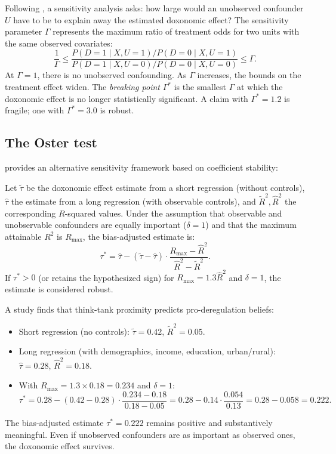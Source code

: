 \begin{model}
\label{mod:sensitivity}
Following \textcite{rosenbaum2002}, a sensitivity analysis asks: how large would an unobserved confounder $U$ have to be to explain away the estimated doxonomic effect?
The sensitivity parameter $\Gamma$ represents the maximum ratio of treatment odds for two units with the same observed covariates:
\[
  \frac{1}{\Gamma} \leq \frac{P(D=1 \mid X, U=1) / P(D=0 \mid X, U=1)}{P(D=1 \mid X, U=0) / P(D=0 \mid X, U=0)} \leq \Gamma.
\]
At $\Gamma = 1$, there is no unobserved confounding.
As $\Gamma$ increases, the bounds on the treatment effect widen.
The \emph{breaking point} $\Gamma^*$ is the smallest $\Gamma$ at which the doxonomic effect is no longer statistically significant.
A claim with $\Gamma^* = 1.2$ is fragile; one with $\Gamma^* = 3.0$ is robust.
\end{model}

\subsection{The Oster test}

\textcite{oster2019} provides an alternative sensitivity framework based on coefficient stability:

\begin{proposition}
\label{prop:oster-test}
Let $\tilde{\tau}$ be the doxonomic effect estimate from a short regression (without controls), $\hat{\tau}$ the estimate from a long regression (with observable controls), and $\tilde{R}^2, \hat{R}^2$ the corresponding $R$-squared values.
Under the assumption that observable and unobservable confounders are equally important ($\delta = 1$) and that the maximum attainable $R^2$ is $R_{\max}$, the bias-adjusted estimate is:
\[
  \tau^* = \hat{\tau} - (\tilde{\tau} - \hat{\tau}) \cdot \frac{R_{\max} - \hat{R}^2}{\hat{R}^2 - \tilde{R}^2}.
\]
If $\tau^* > 0$ (or retains the hypothesized sign) for $R_{\max} = 1.3 \hat{R}^2$ and $\delta = 1$, the estimate is considered robust.
\end{proposition}

\begin{example}
\label{ex:oster-application}
A study finds that think-tank proximity predicts pro-deregulation beliefs:
\begin{itemize}[nosep]
  \item Short regression (no controls): $\tilde{\tau} = 0.42$, $\tilde{R}^2 = 0.05$.
  \item Long regression (with demographics, income, education, urban/rural): $\hat{\tau} = 0.28$, $\hat{R}^2 = 0.18$.
  \item With $R_{\max} = 1.3 \times 0.18 = 0.234$ and $\delta = 1$:
  \[
    \tau^* = 0.28 - (0.42 - 0.28) \cdot \frac{0.234 - 0.18}{0.18 - 0.05} = 0.28 - 0.14 \cdot \frac{0.054}{0.13} = 0.28 - 0.058 = 0.222.
  \]
\end{itemize}
The bias-adjusted estimate $\tau^* = 0.222$ remains positive and substantively meaningful.
Even if unobserved confounders are as important as observed ones, the doxonomic effect survives.
\end{example}

